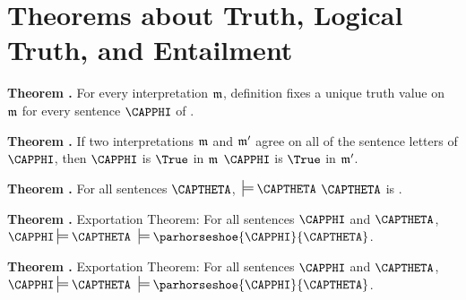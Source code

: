\section*{Theorems about Truth, Logical Truth, and Entailment}

\begin{majorILnc}{\textbf{Theorem .}}
For every interpretation $\mathfrak{m}$, definition  fixes a unique truth value on $\mathfrak{m}$ for every sentence $\CAPPHI$ of \GSL{}. %
\end{majorILnc}


\begin{majorILnc}{\textbf{Theorem .}}
If two interpretations $\mathfrak{m}$ and $\mathfrak{m}'$ agree on all of the sentence letters of $\CAPPHI$, then $\CAPPHI$ is $\True$ in $\mathfrak{m}$ \Iff $\CAPPHI$ is $\True$ in $\mathfrak{m}'$.
\end{majorILnc}

\begin{majorILnc}{\textbf{Theorem .}}
For all \GSL{} sentences $\CAPTHETA$, $\:\sdtstile{}{}\CAPTHETA$ \Iff $\CAPTHETA$ is .
\end{majorILnc} 

\begin{majorILnc}{\textbf{Theorem .} \GSL{} Exportation Theorem:} 
For all \GSL{} sentences $\CAPPHI$ and $\CAPTHETA$, $\CAPPHI\sdtstile{}{}\CAPTHETA$ \Iff $\:\sdtstile{}{}\parhorseshoe{\CAPPHI}{\CAPTHETA}$.
\end{majorILnc}

\begin{majorILnc}{\textbf{Theorem .} \GQL{} Exportation Theorem:} 
For all \GQL{} sentences $\CAPPHI$ and $\CAPTHETA$, $\CAPPHI\sdtstile{}{}\CAPTHETA$ \Iff $\:\sdtstile{}{}\parhorseshoe{\CAPPHI}{\CAPTHETA}$.
\end{majorILnc}

